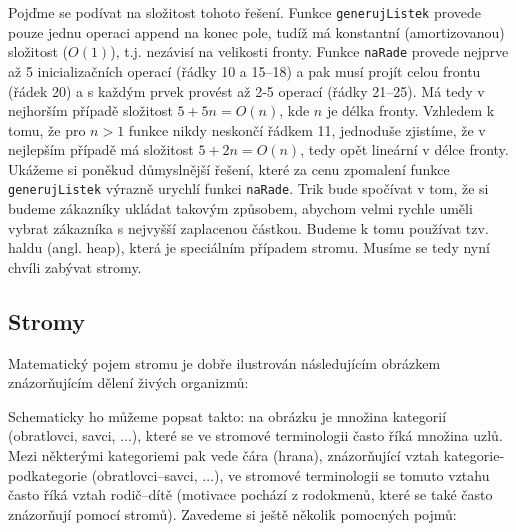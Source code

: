 Pojďme se podívat na složitost tohoto řešení. Funkce {\tt generujListek} provede pouze jednu operaci append na konec pole, tudíž má konstantní (amortizovanou)
složitost ($O(1)$), t.j. nezávisí na velikosti fronty. Funkce {\tt naRade} provede nejprve až 5 inicializačních operací (řádky 10 a 15--18)
a pak musí projít celou frontu (řádek 20) a s každým prvek provést až 2-5 operací (řádky 21--25). Má tedy v nejhorším případě složitost $5 + 5n = O(n)$,
kde $n$ je délka fronty. Vzhledem k tomu, že pro $n>1$ funkce nikdy neskončí řádkem 11, jednoduše zjistíme, že v nejlepším případě má složitost
$5 + 2n = O(n)$, tedy opět lineární v délce fronty. Ukážeme si poněkud důmyslnější řešení, které za cenu zpomalení funkce {\tt generujListek}
výrazně urychlí funkci {\tt naRade}. Trik bude spočívat v tom, že si budeme zákazníky ukládat takovým způsobem, abychom velmi rychle uměli vybrat zákazníka
s nejvyšší zaplacenou částkou. Budeme k tomu používat tzv. haldu (angl. heap), která je speciálním případem stromu. Musíme se tedy nyní chvíli zabývat stromy.

\eject
\subsection*{Stromy} 

Matematický pojem stromu je dobře ilustrován následujícím obrázkem znázorňujícím dělení živých organizmů:

\begin{center}
\end{center}


Schematicky ho můžeme popsat takto: na obrázku je množina kategorií (obratlovci, savci, $\ldots$), které se ve stromové terminologii často říká množina
uzlů. Mezi některými kategoriemi pak vede čára (hrana), znázorňující vztah kategorie-podkategorie (obratlovci--savci, $\ldots$), ve stromové terminologii se tomuto vztahu 
často říká vztah rodič--dítě (motivace pochází z rodokmenů, které se také často znázorňují pomocí stromů). Zavedeme si ještě několik pomocných pojmů:

